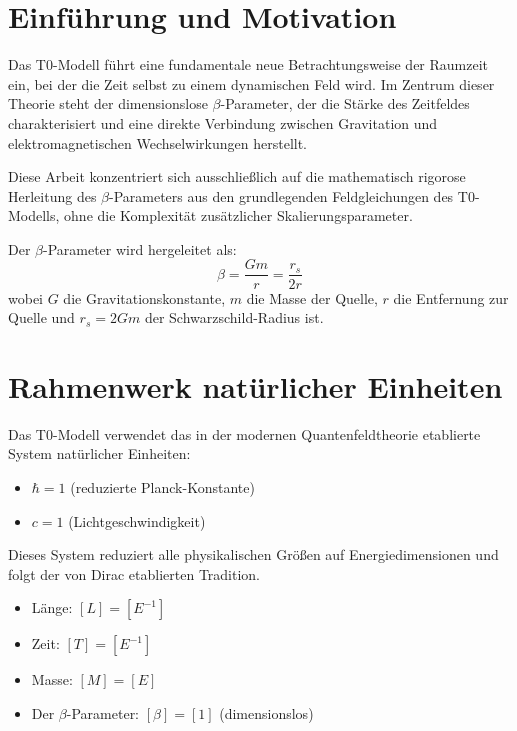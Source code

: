 \section{Einführung und Motivation}
	\label{sec:introduction}
	
	Das T0-Modell führt eine fundamentale neue Betrachtungsweise der Raumzeit ein, bei der die Zeit selbst zu einem dynamischen Feld wird. Im Zentrum dieser Theorie steht der dimensionslose $\beta$-Parameter, der die Stärke des Zeitfeldes charakterisiert und eine direkte Verbindung zwischen Gravitation und elektromagnetischen Wechselwirkungen herstellt.
	
	Diese Arbeit konzentriert sich ausschließlich auf die mathematisch rigorose Herleitung des $\beta$-Parameters aus den grundlegenden Feldgleichungen des T0-Modells, ohne die Komplexität zusätzlicher Skalierungsparameter.
	
	\begin{tcolorbox}[colback=blue!5!white,colframe=blue!75!black,title=Zentrales Ergebnis]
		Der $\beta$-Parameter wird hergeleitet als:
		\begin{equation}
			\boxed{\beta = \frac{Gm}{r} = \frac{r_s}{2r}}
		\end{equation}
		wobei $G$ die Gravitationskonstante, $m$ die Masse der Quelle, $r$ die Entfernung zur Quelle und $r_s = 2Gm$ der Schwarzschild-Radius ist.
	\end{tcolorbox}
	
	\section{Rahmenwerk natürlicher Einheiten}
	\label{sec:natural_units}
	
	Das T0-Modell verwendet das in der modernen Quantenfeldtheorie \citep{peskin1995,weinberg1995} etablierte System natürlicher Einheiten:
	
	\begin{itemize}
		\item $\hbar = 1$ (reduzierte Planck-Konstante)
		\item $c = 1$ (Lichtgeschwindigkeit)
	\end{itemize}
	
	Dieses System reduziert alle physikalischen Größen auf Energiedimensionen und folgt der von Dirac \citep{dirac1958} etablierten Tradition.
	
	\begin{tcolorbox}[colback=blue!5!white,colframe=blue!75!black,title=Dimensionen in natürlichen Einheiten]
		\begin{itemize}
			\item Länge: $[L] = [E^{-1}]$
			\item Zeit: $[T] = [E^{-1}]$ 
			\item Masse: $[M] = [E]$
			\item Der $\beta$-Parameter: $[\beta] = [1]$ (dimensionslos)
		\end{itemize}
	\end{tcolorbox}
	
